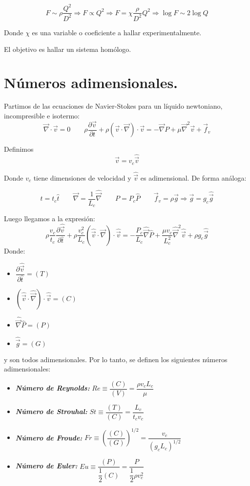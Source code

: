 	\[F \sim \rho \dfrac{Q^2}{D^2} \Rightarrow F \propto Q^2 \Rightarrow F = \chi \dfrac{\rho}{D^2}Q^2 \Rightarrow \log F \sim 2 \log Q\]
	
	
	Donde $\chi$ es una variable o coeficiente a hallar experimentalmente.
	
	
	El objetivo es hallar un sistema homólogo.
	
	\section{Números adimensionales.}
		Partimos de las ecuaciones de Navier-Stokes para un líquido newtoniano, incompresible e isotermo:
		\[\vec \nabla \cdot \vec v = 0 \qquad \rho \dfrac{\partial \vec v}{\partial t} + \rho (\vec v \cdot \vec \nabla)\cdot \vec v = - \vec \nabla P + \mu \vec \nabla^2 \vec v + \vec f_v\]
		
		
		Definimos
		\[\vec v = v_c \hat{\vec v}\]
		
		
		Donde $v_c$ tiene dimensiones de velocidad y $\hat{\vec v}$ es adimensional. De forma análoga:
		
		\[t = t_c \hat t \qquad \vec \nabla = \dfrac{1}{L_c}\hat{\vec \nabla} \qquad P = P_c \hat P \qquad \vec f_v = \rho \vec g \Rightarrow \vec g = g_c \hat{\vec g}\]
		
		
		Luego llegamos a la expresión:
		\[
			\rho \dfrac{v_c}{t_c}\dfrac{\partial \hat{\vec v}}{\partial \hat t} +
			\rho \dfrac{v_c^2}{L_c}(\hat{\vec v}\cdot \hat{\vec \nabla})\cdot \hat{\vec v} = 
			-\dfrac{P_c}{L_c}\hat{\vec \nabla}\hat P + \dfrac{\mu v_c}{L_c^2}\hat{\vec \nabla}^2\hat{\vec v} + \rho g_c\hat{\vec g}
		\]
		\newpage
		Donde:
		\begin{itemize}
			\item $\dfrac{\partial \hat{\vec v}}{\partial \hat t} = (T)$
			\item $(\hat{\vec v}\cdot \hat{\vec \nabla})\cdot \hat{\vec v} = (C)$
			\item $\hat{\vec \nabla}\hat P = (P)$
			\item $\hat{\vec g} = (G)$
		\end{itemize}
		
		
		y son todos adimensionales. Por lo tanto, se definen los siguientes números adimensionales:
		\begin{itemize}
			\item \textbf{\textit{Número de Reynolds:}} $Re \equiv \dfrac{(C)}{(V)} = \dfrac{\rho v_c L_c}{\mu}$
			\item \textit{\textbf{Número de Strouhal:}} $St \equiv \dfrac{(T)}{(C)} = \dfrac{L_c}{t_c v_c}$
			\item \textbf{\textit{Número de Froude:}} $Fr \equiv \left(\dfrac{(C)}{(G)}\right)^{1/2} = \dfrac{v_c}{(g_cL_c)^{1/2}}$
			\item \textbf{\textit{Número de Euler:}} $Eu \equiv \dfrac{(P)}{\dfrac{1}{2}(C)} = \dfrac{P}{\dfrac{1}{2}\rho v_c^2}$
		\end{itemize}
		
